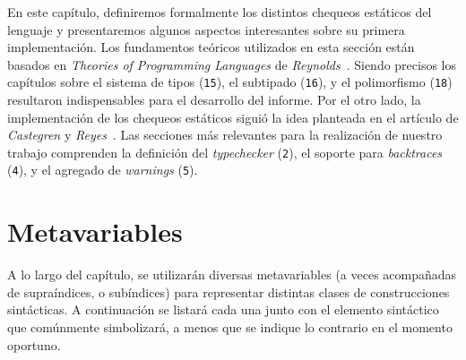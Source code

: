 En este capítulo, definiremos formalmente los distintos chequeos estáticos del lenguaje y presentaremos algunos aspectos interesantes sobre su primera implementación.
Los fundamentos teóricos utilizados en esta sección están basados en \textit{Theories of Programming Languages} de \textit{Reynolds}~\cite{Reynolds}.
Siendo precisos los capítulos sobre el sistema de tipos (\texttt{15}), el subtipado (\texttt{16}), y el polimorfismo (\texttt{18}) resultaron indispensables para el desarrollo del informe.
Por el otro lado, la implementación de los chequeos estáticos siguió la idea planteada en el artículo de \textit{Castegren} y \textit{Reyes}~\cite{MonadicTC}.
Las secciones más relevantes para la realización de nuestro trabajo comprenden la definición del \textit{typechecker} (\texttt{2}), el soporte para \textit{backtraces} (\texttt{4}), y el agregado de \textit{warnings} (\texttt{5}).

\section{Metavariables}

A lo largo del capítulo, se utilizarán diversas metavariables (a veces acompañadas de supraíndices, o subíndices) para representar distintas clases de construcciones sintácticas.
A continuación se listará cada una junto con el elemento sintáctico que comúnmente simbolizará, a menos que se indique lo contrario en el momento oportuno.


